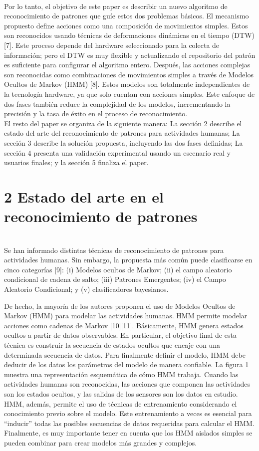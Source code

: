 \documentclass[10pt]{article}
\begin{document}
\\
Por lo tanto, el objetivo de este paper es describir un nuevo algoritmo de reconocimiento de patrones que guíe estos dos problemas básicos. El mecanismo propuesto define acciones como una composición de movimientos simples. Estos son reconocidos usando técnicas de deformaciones dinámicas en el tiempo (DTW) [7]. Este proceso depende del hardware seleccionado para la colecta de información; pero el DTW  es muy flexible y actualizando el repositorio del patrón es suficiente para configurar el algoritmo entero. Después, las acciones complejas son reconocidas como combinaciones de movimientos simples a través de Modelos Ocultos de Markov (HMM) [8]. Estos modelos son totalmente independientes de la tecnología hardware, ya que solo cuentan con acciones simples. Este enfoque de dos fases también reduce la complejidad de los modelos, incrementando la precisión y la tasa de éxito en el proceso de reconocimiento.
\\
El resto del paper se organiza de la siguiente manera: La sección 2 describe el estado del arte del reconocimiento de patrones para actividades humanas; La sección 3 describe la solución propuesta, incluyendo las dos fases definidas; La sección 4 presenta una validación experimental usando un escenario real y usuarios finales; y la sección 5 finaliza el paper.

\section{2 Estado del arte en el reconocimiento de patrones}
\\
Se han informado distintas técnicas de reconocimiento de patrones para actividades humanas. Sin embargo, la propuesta más común puede clasificarse en cinco categorías [9]: (i) Modelos ocultos de Markov; (ii) el campo aleatorio condicional de cadena de salto; (iii) Patrones Emergentes; (iv) el Campo Aleatorio Condicional; y (v) clasificadores bayesianos.

De hecho, la mayoría de los autores proponen el uso de Modelos Ocultos de Markov (HMM) para modelar las actividades humanas. HMM permite modelar acciones como cadenas de Markov [10][11]. Básicamente, HMM genera estados ocultos a partir de datos observables. En particular, el objetivo final de esta técnica es construir la secuencia de estados ocultos que encaje con una determinada secuencia de datos. Para finalmente definir el modelo, HMM debe deducir de los datos los parámetros del modelo de manera confiable. La figura 1 muestra una representación esquemática de cómo HMM trabaja. Cuando las actividades humanas son reconocidas, las acciones que componen las actividades son los estados ocultos, y las salidas de los sensores son los datos en estudio. HMM, además, permite el uso de técnicas de entrenamiento considerando el conocimiento previo sobre el modelo. Este entrenamiento a veces es esencial para “inducir” todas las posibles secuencias de datos requeridas para calcular el HMM. Finalmente, es muy importante tener en cuenta que los HMM aislados simples se pueden combinar para crear modelos más grandes y complejos.
\end{document}
